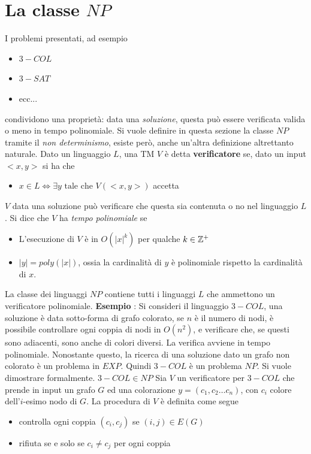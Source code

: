 \documentclass[10pt, letterpaper]{report}
\begin{document}
\section{La classe $NP$}
I problemi presentati, ad esempio 
\begin{itemize}
    \item $3-COL$
    \item $3-SAT$
    \item ecc...
\end{itemize}
condividono una proprietà: data una \textit{soluzione}, questa può essere verificata valida o meno in tempo polinomiale. Si vuole definire in questa sezione la classe $NP$ tramite il \textit{non determinismo}, esiste però, anche un'altra definizione altrettanto naturale.\acc 
{} Dato un linguaggio $L$, una TM $V$ è detta \textbf{verificatore} se, dato un input $<x,y>$ si ha che \begin{itemize}
    \item $x\in L \iff \exists y \text{ tale che }V(<x,y>)$ accetta
\end{itemize}
$V$ data una soluzione può verificare che questa sia contenuta o no nel linguaggio $L$. Si dice che $V$ ha \textit{tempo polinomiale} se \begin{itemize}
    \item L'esecuzione di $V$ è in $O(|x|^k)$ per qualche $k\in{\mathbb Z}^+$
    \item $|y|=poly(|x|)$, ossia la cardinalità di $y$ è polinomiale rispetto la cardinalità di $x$.
\end{itemize}
 La classe dei linguaggi $NP$ contiene tutti i linguaggi $L$ che ammettono un verificatore polinomiale.\acc 
\textbf{Esempio} : Si consideri il linguaggio $3-COL$, una soluzione è data sotto-forma di grafo colorato, se $n$ è il numero di nodi,  è possibile controllare ogni coppia di nodi in $O(n^2)$, e verificare che, se questi sono adiacenti, sono anche di colori diversi. La verifica avviene in tempo polinomiale. Nonostante questo, la ricerca di una soluzione dato un grafo non colorato è un problema in $EXP$. Quindi $3-COL$ è un problema $NP$. Si vuole dimostrare formalmente.\acc
\prop{} $3-COL\in NP$\acc 
\dimo{} Sia $V$ un verificatore per $3-COL$ che prende in input un grafo $G$ ed una colorazione 
$y=(c_1,c_2\dots c_n)$, con $c_i$ colore dell'$i$-esimo nodo di $G$. La procedura di $V$ è definita come segue\begin{itemize}
    \item controlla ogni coppia $(c_i,c_j)$ se $(i,j)\in E(G)$ 
    \item rifiuta se e solo se $c_i\ne c_j$ per ogni coppia 
\end{itemize}
\end{document}
